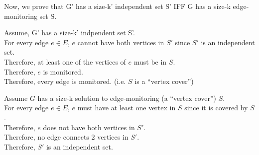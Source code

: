 \documentclass[11pt]{article}
\begin{document}
\begin{enumerate}
    Now, we prove that G' has a size-k' independent set S' IFF G has a size-k edge-monitoring set S.

    Assume, G' has a size-k' indpendent set S'.\\
    For every edge $e \in E$, $e$ cannot have both vertices in $S'$ since $S'$ is an independent set.\\
    Therefore, at least one of the vertices of $e$ must be in $S$.\\
    Therefore, $e$ is monitored.\\
    Therefore, every edge is monitored. (i.e. $S$ is a ``vertex cover'')

    Assume $G$ has a size-k solution to edge-monitoring (a ``vertex cover'') $S$.\\
    For every edge $e \in E$, $e$ must have at least one vertex in $S$ since it is covered by $S$.\\
    Therefore, $e$ does not have both vertices in $S'$.\\
    Therefore, no edge connects 2 vertices in $S'$.\\
    Therefore, $S'$ is an independent set.
\end{enumerate}
\end{document}
